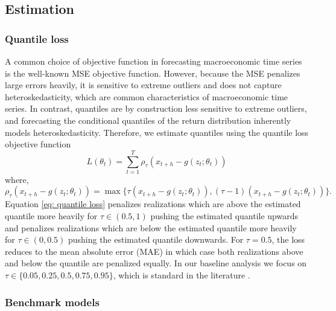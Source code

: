 \documentclass[12pt]{article}
\begin{document}
\subsection{Estimation}

\subsubsection{Quantile loss}

A common choice of objective function in forecasting macroeconomic time series is the well-known MSE objective function. However, because the MSE penalizes large errors heavily, it is sensitive to extreme outliers and does not capture heteroskedasticity, which are common characteristics of macroeconomic time series.
In contrast, quantiles are by construction less sensitive to extreme outliers, and forecasting the conditional quantiles of the return distribution inherently models heteroskedasticity. Therefore, we estimate quantiles using the quantile loss objective function 
\begin{equation}
	L(\theta_t) = \sum_{t=1}^T \rho_\tau(x_{t+h} - g(z_t; \theta_t))
\end{equation}
where,
\begin{equation}\label{eq: quantile loss}
	\rho_\tau(x_{t+h} - g(z_t; \theta_t)) = \max\{ \tau (x_{t+h} - g(z_t; \theta_t)), (\tau-1) (x_{t+h} - g(z_t; \theta_t)) \}.
\end{equation}
Equation \ref{eq: quantile loss} penalizes realizations which are above the estimated quantile more heavily for $\tau \in (0.5, 1)$ pushing the estimated quantile upwards and penalizes realizations which are below the estimated quantile more heavily for $\tau \in (0, 0.5)$ pushing the estimated quantile downwards. For $\tau = 0.5$, the loss reduces to the mean absolute error (MAE) in which case both realizations above and below the quantile are penalized equally. In our baseline analysis we focus on $\tau \in \{0.05, 0.25, 0.5, 0.75, 0.95\}$, which is standard in the literature \citep{adrianVulnerableGrowth2019,kileyUnemploymentRisk2022,lopez-salidoInflationRisk2024}.

\subsubsection{Benchmark models}\label{sec: benchmark models}
\end{document}
